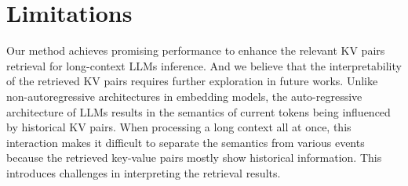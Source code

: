 \section*{Limitations}
Our method achieves promising performance to enhance the relevant KV pairs retrieval for long-context LLMs inference. And we believe that the interpretability of the retrieved KV pairs requires further exploration in future works. Unlike non-autoregressive architectures in embedding models, the auto-regressive architecture of LLMs results in the semantics of current tokens being influenced by historical KV pairs. When processing a long context all at once, this interaction makes it difficult to separate the semantics from various events because the retrieved key-value pairs mostly show historical information. This introduces challenges in interpreting the retrieval results.